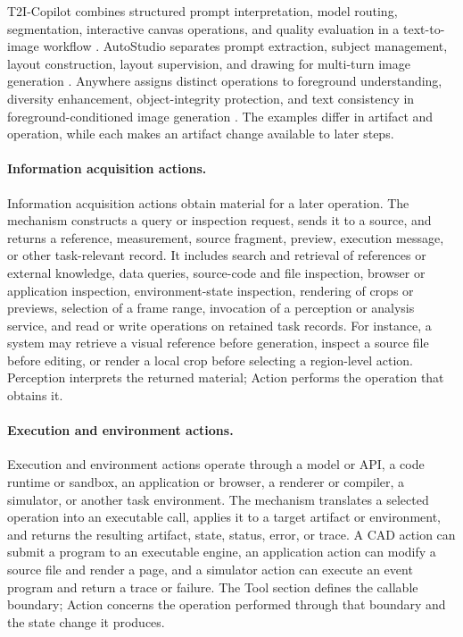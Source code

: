 T2I-Copilot combines structured prompt interpretation, model routing, segmentation, interactive canvas operations, and quality evaluation in a text-to-image workflow \cite{chen2025t2icopilot}. AutoStudio separates prompt extraction, subject management, layout construction, layout supervision, and drawing for multi-turn image generation \cite{cheng2024autostudio}. Anywhere assigns distinct operations to foreground understanding, diversity enhancement, object-integrity protection, and text consistency in foreground-conditioned image generation \cite{xie2024anywhere}. The examples differ in artifact and operation, while each makes an artifact change available to later steps.

\paragraph{Information acquisition actions.}
Information acquisition actions obtain material for a later operation. The mechanism constructs a query or inspection request, sends it to a source, and returns a reference, measurement, source fragment, preview, execution message, or other task-relevant record. It includes search and retrieval of references or external knowledge, data queries, source-code and file inspection, browser or application inspection, environment-state inspection, rendering of crops or previews, selection of a frame range, invocation of a perception or analysis service, and read or write operations on retained task records. For instance, a system may retrieve a visual reference before generation, inspect a source file before editing, or render a local crop before selecting a region-level action. Perception interprets the returned material; Action performs the operation that obtains it.

\paragraph{Execution and environment actions.}
Execution and environment actions operate through a model or API, a code runtime or sandbox, an application or browser, a renderer or compiler, a simulator, or another task environment. The mechanism translates a selected operation into an executable call, applies it to a target artifact or environment, and returns the resulting artifact, state, status, error, or trace. A CAD action can submit a program to an executable engine, an application action can modify a source file and render a page, and a simulator action can execute an event program and return a trace or failure. The Tool section defines the callable boundary; Action concerns the operation performed through that boundary and the state change it produces.

